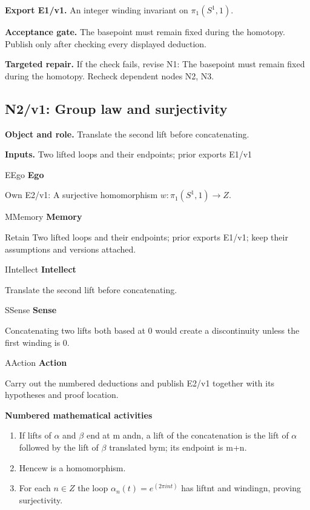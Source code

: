 \documentclass[preprint,12pt,aps,pra,showkeys,amsmath,amssymb,superscriptaddress,floatfix]{revtex4-2}
\theoremstyle{definition}
\theoremstyle{remark}
\newcommand{\mmfaculty}[3]{%
 \begin{mmfacultybox}{#1}{#2}
 {\sffamily\bfseries\color{MMBlue}#2}\par\smallskip #3
 \end{mmfacultybox}}
\newcommand{\field}[2]{\par\smallskip\noindent\textbf{#1.} #2\par}
\begin{document}
\field{Export E1/v1}{An integer winding invariant on \(\pi _{1}(S^{1},1)\).}

\field{Acceptance gate}{The basepoint must remain fixed during the homotopy. Publish only after
checking every displayed deduction.}

\field{Targeted repair}{If the check fails, revise N1: The basepoint must remain fixed during
the homotopy. Recheck dependent nodes N2, N3.}

\clearpage

\subsection{N2/v1: Group law and surjectivity}

\field{Object and role}{Translate the second lift before concatenating.}

\field{Inputs}{Two lifted loops and their endpoints; prior exports E1/v1}

\mmfaculty{E}{Ego}{Own E2/v1: A surjective homomorphism \(w:\pi _{1}(S^{1},1)\to Z\).}

\mmfaculty{M}{Memory}{Retain Two lifted loops and their endpoints; prior exports E1/v1; keep
their assumptions and versions attached.}

\mmfaculty{I}{Intellect}{Translate the second lift before concatenating.}

\mmfaculty{S}{Sense}{Concatenating two lifts both based at 0 would create a discontinuity
unless the first winding is 0.}

\mmfaculty{A}{Action}{Carry out the numbered deductions and publish E2/v1 together with its
hypotheses and proof location.}

\smallskip\noindent\textbf{Numbered mathematical activities}

\begin{enumerate}[label=N2.\arabic*,leftmargin=3.4em]

\item If lifts of \(\alpha\) and \(\beta\) end at m andn, a lift of the
concatenation is the lift of \(\alpha\) followed by the lift of
\(\beta\) translated bym; its endpoint is m+n.

\item Hencew is a homomorphism.

\item For each \(n\in Z\) the loop \(\alpha _n(t)=e^{(2\pi int)}\) has liftnt
and windingn, proving surjectivity.

\end{enumerate}
\end{document}
